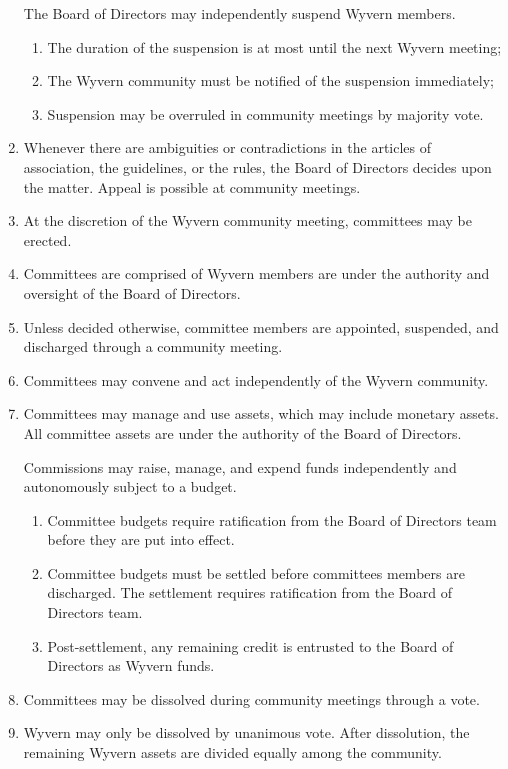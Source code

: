 \begin{enumerate}
    \begin{item}
        The Board of Directors may independently suspend Wyvern members.
        \begin{enumerate}
            \item The duration of the suspension is at most until the next Wyvern meeting;
            \item The Wyvern community must be notified of the suspension immediately;
            \item Suspension may be overruled in community meetings by majority vote.
       \end{enumerate}
    \end{item}

    \item Whenever there are ambiguities or contradictions in the articles of association, the guidelines, or the rules, the Board of Directors decides upon the matter. Appeal is possible at community meetings.

    \item At the discretion of the Wyvern community meeting, committees may be erected.

    \item Committees are comprised of Wyvern members are under the authority and oversight of the Board of Directors.

    \item Unless decided otherwise, committee members are appointed, suspended, and discharged through a community meeting.

    \item Committees may convene and act independently of the Wyvern community.

    \item Committees may manage and use assets, which may include monetary assets. All committee assets are under the authority of the Board of Directors.

    \begin{item}
            Commissions may raise, manage, and expend funds independently and autonomously subject to a budget.
            \begin{enumerate}
                \item Committee budgets require ratification from the Board of Directors team before they are put into effect.
                \item Committee budgets must be settled before committees members are discharged. The settlement requires ratification from the Board of Directors team.
                \item Post-settlement, any remaining credit is entrusted to the Board of Directors as Wyvern funds.
            \end{enumerate}
    \end{item}

    \item Committees may be dissolved during community meetings through a vote.

    \item Wyvern may only be dissolved by unanimous vote. After dissolution, the remaining Wyvern assets are divided equally among the community.

\end{enumerate}
